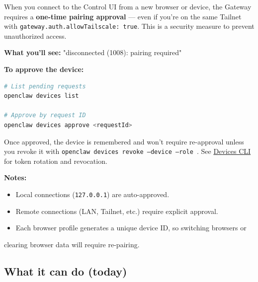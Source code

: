 When you connect to the Control UI from a new browser or device, the Gateway
requires a \textbf{one-time pairing approval} — even if you're on the same Tailnet
with \texttt{gateway.auth.allowTailscale: true}. This is a security measure to prevent
unauthorized access.

\textbf{What you'll see:} "disconnected (1008): pairing required"

\textbf{To approve the device:}

\begin{lstlisting}[language=bash]
# List pending requests
openclaw devices list

# Approve by request ID
openclaw devices approve <requestId>
\end{lstlisting}


Once approved, the device is remembered and won't require re-approval unless
you revoke it with \texttt{openclaw devices revoke --device  --role }. See
\href{/cli/devices}{Devices CLI} for token rotation and revocation.

\textbf{Notes:}

\begin{itemize}
  \item Local connections (\texttt{127.0.0.1}) are auto-approved.
  \item Remote connections (LAN, Tailnet, etc.) require explicit approval.
  \item Each browser profile generates a unique device ID, so switching browsers or
\end{itemize}

clearing browser data will require re-pairing.

\subsection{What it can do (today)}


